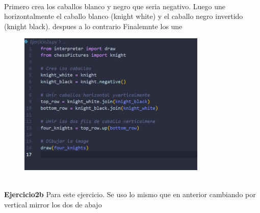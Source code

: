 \documentclass{article}
\begin{document}
\\    
Primero crea los caballos blanco y negro que seria negativo. Luego
une horizontalmente el caballo blanco (knight white) y el caballo negro invertido (knight black). despues a lo contrario
Finalemnte los une 
    \begin{figure}[H]
		          \centering
		          \includegraphics[width=0.8\textwidth,keepaspectratio]                       {img/eja.png}
    \end{figure}
\\
\textbf{Ejercicio2b }
Para este ejercicio. Se uso lo mismo que en anterior cambiando por vertical mirror los dos de abajo
\end{document}
